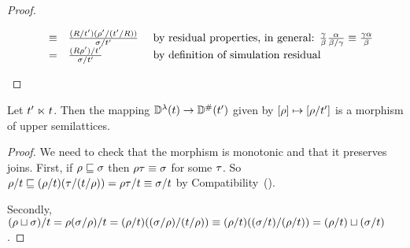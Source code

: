 \begin{proof}
\begin{enumerate}
\[\begin{array}{rcll}
        & \equiv & \frac{(R / t') (\rho' / (t' / R))}{\sigma / t'} & \text{ by residual properties, in general: $\frac{\gamma}{\beta} \frac{\alpha}{\beta/\gamma} \equiv \frac{\gamma \alpha}{\beta}$}\\
        & = & \frac{(R \rho') / t'}{\sigma / t'} & \text{ by definition of simulation residual}\\
      \end{array}
    \]
\end{enumerate}
\end{proof}


\begin{corollary}
Let $t' \mathrel{\ltimes} t$.
Then the mapping $\mathbb{D}^{\lambda}(t) \to \mathbb{D}^{\mathtt{\#}}(t')$
given by ${[\rho]} \mapsto {[\rho/t']}$ is a morphism of upper
semilattices.
\end{corollary}
\begin{proof}
We need to check that the morphism is monotonic and that it preserves joins.
First, if $\rho \sqsubseteq \sigma$ 
then $\rho\tau \equiv \sigma$ for some $\tau$.
So $\rho/t \sqsubseteq (\rho/t)(\tau/(t/\rho)) = \rho\tau/t \equiv \sigma/t$
by Compatibility~().

Secondly,
$
  (\rho \sqcup \sigma)/t =
  \rho(\sigma/\rho)/t =
  (\rho/t)((\sigma/\rho)/(t/\rho)) \equiv
  (\rho/t)((\sigma/t)/(\rho/t)) =
  (\rho/t) \sqcup (\sigma/t)
$.
\end{proof}

